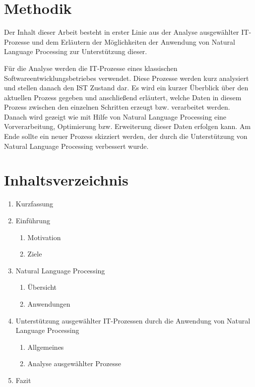 \documentclass[a4paper]{scrartcl}
\begin{document}
\section{Methodik}
Der Inhalt dieser Arbeit besteht in erster Linie aus der Analyse ausgewählter IT-Prozesse und dem Erläutern der Möglichkeiten der Anwendung von Natural Language Processing zur Unterstützung dieser. 

Für die Analyse werden die IT-Prozesse eines klassischen Softwareentwicklungsbetriebes verwendet. Diese Prozesse werden kurz analysiert und stellen danach den IST Zustand dar. Es wird ein kurzer Überblick über den aktuellen Prozess gegeben und anschließend erläutert, welche Daten in diesem Prozess zwischen den einzelnen Schritten erzeugt bzw. verarbeitet werden. Danach wird gezeigt wie mit Hilfe von Natural Language Processing eine Vorverarbeitung, Optimierung bzw. Erweiterung dieser Daten erfolgen kann. Am Ende sollte ein neuer Prozess skizziert werden, der durch die Unterstützung von Natural Language Processing verbessert wurde. 

\section{Inhaltsverzeichnis}
\begin{enumerate}
	\item Kurzfassung
	\item Einführung
	\begin{enumerate}
			\item Motivation
			\item Ziele
	\end{enumerate}
	\item Natural Language Processing
	\begin{enumerate}
			\item Übersicht
			\item Anwendungen
	\end{enumerate}
	\item Unterstützung ausgewählter IT-Prozessen durch die Anwendung von Natural Language Processing
	\begin{enumerate}
			\item Allgemeines
			\item Analyse ausgewählter Prozesse
	\end{enumerate}
	\item Fazit
\end{enumerate}


 
\end{document}
